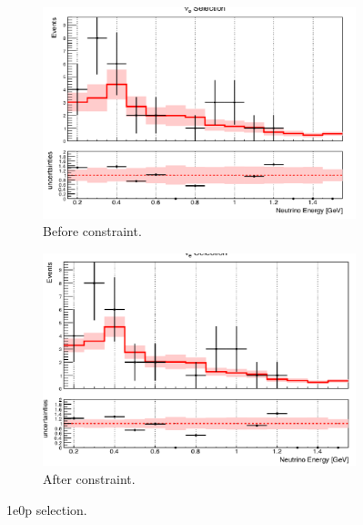 \begin{figure}[H] 
\begin{center}
    \begin{subfigure}[b]{0.45\textwidth}
    \centering
    \includegraphics[width=1.00\textwidth]{Fakedata/set3/zp_before_constrain.pdf}
    \caption{\label{fig:fakedata:set3:zp_before_constrain} Before constraint.}
    \end{subfigure}
    \begin{subfigure}[b]{0.45\textwidth}
    \centering
    \includegraphics[width=1.00\textwidth]{Fakedata/set3/zp_after_constrain.pdf}
    \caption{\label{fig:fakedata:set3:zp_after_constrain} After constraint.}
    \end{subfigure}
\caption{\label{fig:fakedata:set3:zp_const} 1e0p selection.}
\end{center}
\end{figure}

